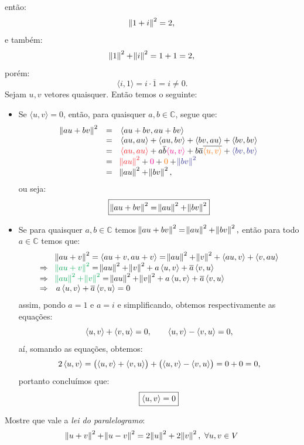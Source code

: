 \documentclass[11pt,a4paper]{article}
\begin{document}
{{\[\]
então:
\[
\norm{1+i}^2=2,
\]
e também:
\[
\norm{1}^2+\norm{i}^2=1+1=2,
\]
porém:
\[
\langle i,1\rangle=i\cdot\overline{1}=i\neq 0.
\]
\task[\pers{c}] Sejam $u,v$ vetores quaisquer. Então temos o seguinte:
\begin{itemize}
\item Se $\langle u,v\rangle=0$, então, para quaisquer $a,b\in\mathbb{C}$, segue que:
\[
\begin{array}{rcl}
\norm{au+bv}^2 &=& \prin{au + bv, au+bv} \\&=& \prin{au,au} + \prin{au,bv} + \prin{bv,au} + \prin{bv,bv} \\&=& \textcolor{Red}{\prin{au,au}} + a\overline{b}\textcolor{Magenta}{\prin{u,v}} + b\overline{a}\overline{\textcolor{Laranja}{\prin{u,v}}} + \textcolor{Blue}{\prin{bv,bv}} \\&=& \textcolor{Red}{\norm{au}^2} + \textcolor{Magenta}{0} + \textcolor{Laranja}{0} + \textcolor{Blue}{\norm{bv}^2} \\&=& \norm{au}^2 + \norm{bv}^2,
\end{array}
\]
ou seja:
\[
\boxed{\norm{au+bv}^2= \norm{au}^2 + \norm{bv}^2}
\]
\item Se para quaisquer $a,b\in\mathbb{C}$ temos $\norm{au+bv}^2= \norm{au}^2 + \norm{bv}^2,$ então para todo $a\in\mathbb{C}$ temos que:
\[
\begin{array}{cl}
&\norm{au+v}^2 = \prin{au+v, au+v} = \norm{au}^2 + \norm{v}^2 + \prin{au,v} + \prin{v,au} \\\Rightarrow& \textcolor{Green}{\norm{au+v}^2} = \norm{au}^2 + \norm{v}^2 + a\prin{u,v} + \overline{a}\prin{v,u} \\\Rightarrow& \textcolor{Green}{\norm{au}^2 + \norm{v}^2} = \norm{au}^2 + \norm{v}^2 + a\prin{u,v} + \overline{a}\prin{v,u} \\\Rightarrow& a\prin{u,v} + \overline{a}\prin{v,u} = 0
\end{array}
\]
assim, pondo $a=1$ e $a=i$ e simplificando, obtemos respectivamente as equações:
\[
\left\langle u,v \right\rangle + \left\langle v,u \right\rangle = 0,\quad\quad \left\langle u,v \right\rangle - \left\langle v,u \right\rangle = 0,
\]
aí, somando as equações, obtemos:
\[
2\left\langle u,v \right\rangle=\left(\left\langle u,v \right\rangle+\left\langle v,u \right\rangle\right)+\left(\left\langle u,v \right\rangle-\left\langle v,u \right\rangle\right)=0+0=0,
\]
portanto concluímos que:
\[
\boxed{\left\langle u,v \right\rangle=0}
\]
\end{itemize}
}
}
 Mostre que vale a \emph{lei do paralelogramo}:
\[
\norm{u + v}^2 + \norm{u-v}^2 = 2 \norm{u}^2 + 2 \norm{v}^2, \ \forall u,v \in V
\]
\end{document}
